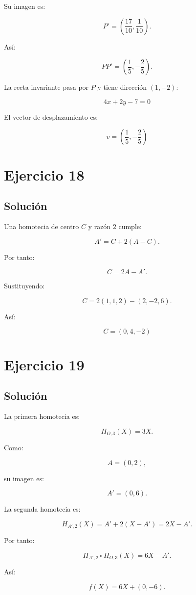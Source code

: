 \documentclass[11pt,a4paper]{article}
\begin{document}
Su imagen es:

\[
P'=
\left(
\frac{17}{10},
\frac1{10}
\right).
\]

Así:

\[
PP'
=
\left(
\frac15,-\frac25
\right).
\]

La recta invariante pasa por \(P\) y tiene dirección \((1,-2)\):

\[
\boxed{
4x+2y-7=0
}
\]

El vector de desplazamiento es:

\[
\boxed{
v=
\left(
\frac15,-\frac25
\right)
}
\]

\section{Ejercicio 18}
\subsection{Solución}

Una homotecia de centro \(C\) y razón \(2\) cumple:

\[
A'=C+2(A-C).
\]

Por tanto:

\[
C=2A-A'.
\]

Sustituyendo:

\[
C
=
2(1,1,2)-(2,-2,6).
\]

Así:

\[
\boxed{
C=(0,4,-2)
}
\]

\section{Ejercicio 19}
\subsection{Solución}

La primera homotecia es:

\[
H_{O,3}(X)=3X.
\]

Como:

\[
A=(0,2),
\]

su imagen es:

\[
A'=(0,6).
\]

La segunda homotecia es:

\[
H_{A',2}(X)
=
A'+2(X-A')
=
2X-A'.
\]

Por tanto:

\[
H_{A',2}\circ H_{O,3}(X)
=
6X-A'.
\]

Así:

\[
f(X)
=
6X+(0,-6).
\]
\end{document}
